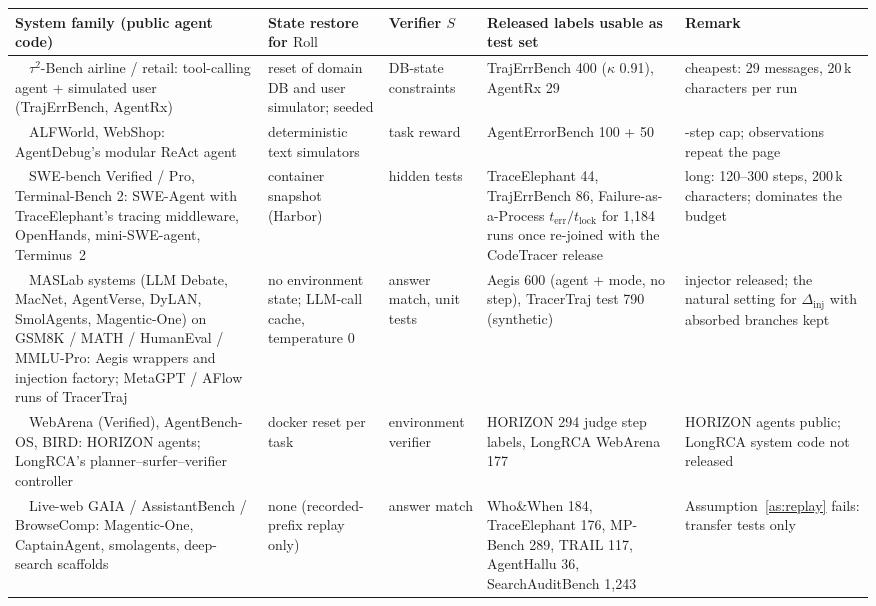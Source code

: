 \medskip\noindent\begin{minipage}{\linewidth}\centering\scriptsize
\setlength{\tabcolsep}{3pt}
\begin{tabularx}{\linewidth}{@{}>{\RaggedRight\hsize=1.15\hsize}X >{\RaggedRight\hsize=0.8\hsize}X >{\RaggedRight\hsize=0.65\hsize}X >{\RaggedRight\hsize=1.2\hsize}X >{\RaggedRight\hsize=1.2\hsize}X@{}}\toprule
System family (public agent code) & State restore for $\mathrm{Roll}$ & Verifier $S$ & Released labels usable as test set & Remark \\\midrule
1\ \ $\tau^2$-Bench airline / retail: tool-calling agent + simulated user (TrajErrBench, AgentRx) & reset of domain DB and user simulator; seeded & DB-state constraints & TrajErrBench 400 ($\kappa$ 0.91), AgentRx 29 & cheapest: 29 messages, 20\,k characters per run \\
2\ \ ALFWorld, WebShop: AgentDebug's modular ReAct agent & deterministic text simulators & task reward & AgentErrorBench 100 + 50 & 30-step cap; observations repeat the page \\
3\ \ SWE-bench Verified / Pro, Terminal-Bench 2: SWE-Agent with TraceElephant's tracing middleware, OpenHands, mini-SWE-agent, Terminus~2 & container snapshot (Harbor) & hidden tests & TraceElephant 44, TrajErrBench 86, Failure-as-a-Process $t_{\mathrm{err}}/t_{\mathrm{lock}}$ for 1,184 runs once re-joined with the CodeTracer release & long: 120--300 steps, 200\,k characters; dominates the budget \\
4\ \ MASLab systems (LLM Debate, MacNet, AgentVerse, DyLAN, SmolAgents, Magentic-One) on GSM8K / MATH / HumanEval / MMLU-Pro: Aegis wrappers and injection factory; MetaGPT / AFlow runs of TracerTraj & no environment state; LLM-call cache, temperature 0 & answer match, unit tests & Aegis 600 (agent + mode, no step), TracerTraj test 790 (synthetic) & injector released; the natural setting for $\Delta_{\mathrm{inj}}$ with absorbed branches kept \\
5\ \ WebArena (Verified), AgentBench-OS, BIRD: HORIZON agents; LongRCA's planner--surfer--verifier controller & docker reset per task & environment verifier & HORIZON 294 judge step labels, LongRCA WebArena 177 & HORIZON agents public; LongRCA system code not released \\
6\ \ Live-web GAIA / AssistantBench / BrowseComp: Magentic-One, CaptainAgent, smolagents, deep-search scaffolds & none (recorded-prefix replay only) & answer match & Who\&When 184, TraceElephant 176, MP-Bench 289, TRAIL 117, AgentHallu 36, SearchAuditBench 1,243 & Assumption~\ref{as:replay} fails: transfer tests only \\\bottomrule
\end{tabularx}
\label{tab:engine}
\end{minipage}\medskip
